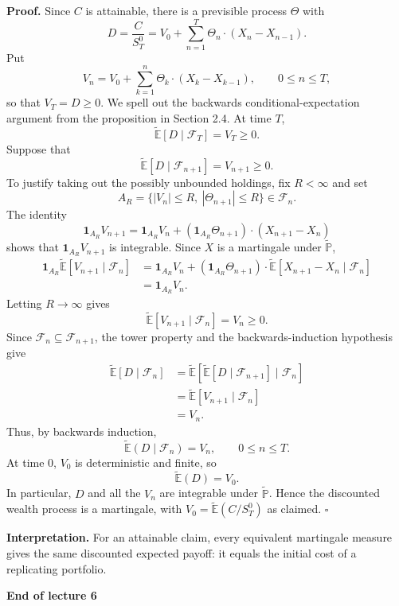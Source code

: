 \documentclass[11pt,a4paper]{article}
\begin{document}
\noindent\textbf{Proof.}
Since $C$ is attainable, there is a previsible process $\Theta$ with
\[
D=\frac{C}{S_T^0}
=V_0+\sum_{n=1}^T\Theta_n\cdot(X_n-X_{n-1}).
\]
Put
\[
V_n=V_0+\sum_{k=1}^n\Theta_k\cdot(X_k-X_{k-1}),
\qquad 0\leq n\leq T,
\]
so that $V_T=D\geq0$. We spell out the backwards
conditional-expectation argument from the proposition in Section 2.4.
At time $T$,
\[
\widetilde{\mathbb E}[D\mid\mathcal F_T]=V_T\geq0.
\]
Suppose that
\[
\widetilde{\mathbb E}[D\mid\mathcal F_{n+1}]=V_{n+1}\geq0.
\]
To justify taking out the possibly unbounded holdings, fix $R<\infty$
and set
\[
A_R=\{|V_n|\leq R,\ |\Theta_{n+1}|\leq R\}\in\mathcal F_n.
\]
The identity
\[
\mathbf1_{A_R}V_{n+1}
=\mathbf1_{A_R}V_n
+(\mathbf1_{A_R}\Theta_{n+1})\cdot(X_{n+1}-X_n)
\]
shows that $\mathbf1_{A_R}V_{n+1}$ is integrable. Since $X$ is a
martingale under $\widetilde{\mathbb P}$,
\[
\begin{aligned}
\mathbf1_{A_R}\widetilde{\mathbb E}[V_{n+1}\mid\mathcal F_n]
&=\mathbf1_{A_R}V_n
+(\mathbf1_{A_R}\Theta_{n+1})\cdot
\widetilde{\mathbb E}[X_{n+1}-X_n\mid\mathcal F_n]\\
&=\mathbf1_{A_R}V_n.
\end{aligned}
\]
Letting $R\to\infty$ gives
\[
\widetilde{\mathbb E}[V_{n+1}\mid\mathcal F_n]=V_n\geq0.
\]
Since $\mathcal F_n\subseteq\mathcal F_{n+1}$, the tower property and
the backwards-induction hypothesis give
\[
\begin{aligned}
\widetilde{\mathbb E}[D\mid\mathcal F_n]
&=\widetilde{\mathbb E}\!\left[
\widetilde{\mathbb E}[D\mid\mathcal F_{n+1}]
\mid\mathcal F_n\right]\\
&=\widetilde{\mathbb E}[V_{n+1}\mid\mathcal F_n]\\
&=V_n.
\end{aligned}
\]
Thus, by backwards induction,
\[
\widetilde{\mathbb E}(D\mid\mathcal F_n)=V_n,
\qquad 0\leq n\leq T.
\]
At time $0$, $V_0$ is deterministic and finite, so
\[
\widetilde{\mathbb E}(D)=V_0.
\]
In particular, $D$ and all the $V_n$ are integrable under
$\widetilde{\mathbb P}$.
Hence the discounted wealth process is a martingale, with
$V_0=\widetilde{\mathbb E}(C/S_T^0)$ as claimed.
\hfill$\square$

\medskip
\noindent\textbf{Interpretation.}
For an attainable claim, every equivalent martingale measure gives the
same discounted expected payoff: it equals the initial cost of a
replicating portfolio.

\begin{center}
\textbf{End of lecture 6}
\end{center}
\end{document}
